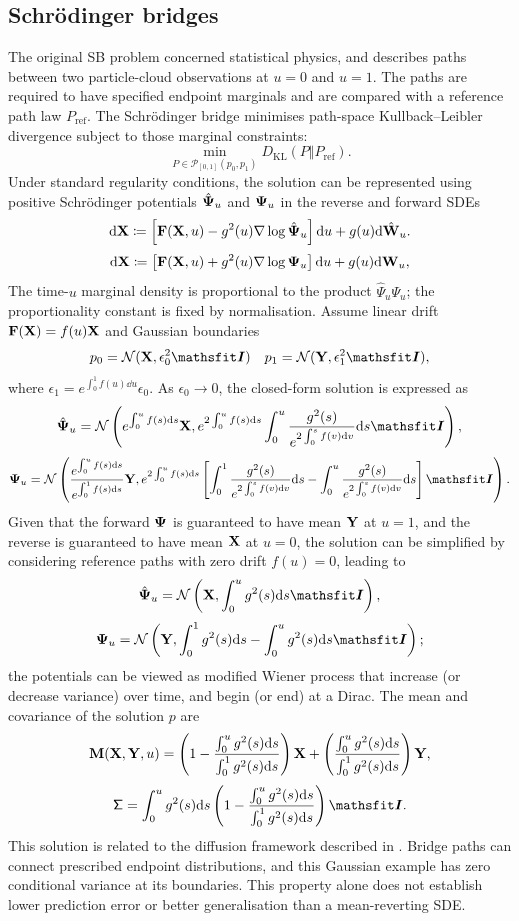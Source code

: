 \subsection{Schr\"odinger bridges}
\label{sec:schr}


The original \ac{SB} problem concerned statistical physics, and describes paths between two particle-cloud observations at $u=0$ and $u=1$. The paths are required to have specified endpoint marginals and are compared with a reference path law $P_\mathrm{ref}$. The Schr\"odinger bridge minimises path-space Kullback--Leibler divergence subject to those marginal constraints:
\[
\min _{P\in\mathcal{P}_{\left[0,1\right]}(p_0,p_1)} D_{\text{KL}}(P\Vert P_\mathrm{ref}).
\]
Under standard regularity conditions, the solution can be represented using positive Schr\"odinger potentials $\hat{{\bm\Psi}}_u$ and ${\bm\Psi}_u$ in the reverse and forward \acp{SDE}
\[
\mathrm{d}{\mathbf{X}} \coloneqq \left[{\mathbf{F}}({\mathbf{X}},u) - g^2(u)\nabla\log\hat{{\bm\Psi}}_u\right]\mathrm{d} u + g(u)\mathrm{d} \hat{{\mathbf{W}}}_u.
\]
\[
\mathrm{d}{\mathbf{X}} \coloneqq \left[{\mathbf{F}}({\mathbf{X}},u) + g^2(u)\nabla\log{\bm\Psi}_u\right]\mathrm{d} u + g(u)\mathrm{d} {\mathbf{W}}_u,
\]
The time-$u$ marginal density is proportional to the product $\hat\Psi_u\Psi_u$; the proportionality constant is fixed by normalisation.
Assume linear drift ${\mathbf{F}}({\mathbf{X}})=f(u){\mathbf{X}}$ and Gaussian boundaries
\[
p_0=\gN(\rmX,\epsilon_0^2\tI) \quad p_1=\gN(\rmY,\epsilon_1^2\tI),
\]
where $\epsilon_1=e^{\int_0^1f(u)\dd u}\epsilon_0$. As $\epsilon_0\rightarrow 0$, the closed-form solution \citep{bunne2023schrodinger} is expressed as
\[
\hat\mPsi_u=\gN\left(e^{\int_0^uf(s)\dd s}\rmX,e^{2\int_0^uf(s)\dd s}\int_0^u\frac{g^2(s)}{e^{2\int_0^sf(v)\dd v}}\dd s\tI\right),
\]
\[
\mPsi_u=\gN\left(\frac{e^{\int_0^uf(s)\dd s}}{e^{\int_0^1f(s)\dd s}}\rmY,e^{2\int_0^uf(s)\dd s}\left[\int_0^1\frac{g^2(s)}{e^{2\int_0^sf(v)\dd v}}\dd s - \int_0^u\frac{g^2(s)}{e^{2\int_0^sf(v)\dd v}}\dd s\right]\tI\right).
\]
Given that the forward ${\bm\Psi}$ is guaranteed to have mean ${\mathbf{Y}}$ at $u=1$, and the reverse is guaranteed to have mean ${\mathbf{X}}$ at $u=0$, the solution can be simplified by considering reference paths with zero drift $f(u)=0$, leading to
\[
\hat\mPsi_u=\gN\left(\rmX,\int_0^ug^2(s)\dd s\tI\right),
\]
\[
\mPsi_u=\gN\left(\rmY,\int_0^1g^2(s)\dd s - \int_0^ug^2(s)\dd s\tI\right);
\]
the potentials can be viewed as modified Wiener process that increase (or decrease variance) over time, and begin (or end) at a Dirac.
The mean and covariance of the solution $p$ are
\[
\label{eq:bridge-mean}
{\mathbf{M}}({\mathbf{X}},{\mathbf{Y}},u)=\left(1-\frac{\int_0^ug^2(s)\mathrm{d} s}{\int_0^1g^2(s)\mathrm{d} s}\right){\mathbf{X}} + \left(\frac{\int_0^ug^2(s)\mathrm{d} s}{\int_0^1g^2(s)\mathrm{d} s}\right){\mathbf{Y}},
\]
\[
\label{eq:bridge-covariance}
\tSigma = \int_0^ug^2(s)\dd s\left(1-\frac{\int_0^ug^2(s)\dd s}{\int_0^1g^2(s)\dd s}\right)\tI.
\]
This solution is related to the diffusion framework described in . Bridge paths can connect prescribed endpoint distributions, and this Gaussian example has zero conditional variance at its boundaries. This property alone does not establish lower prediction error or better generalisation than a mean-reverting \ac{SDE}.


